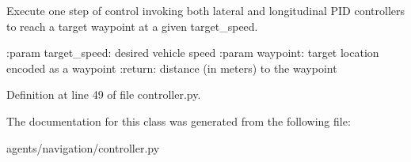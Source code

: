 \begin{DoxyVerb}Execute one step of control invoking both lateral and longitudinal PID controllers to reach a target waypoint
at a given target_speed.

:param target_speed: desired vehicle speed
:param waypoint: target location encoded as a waypoint
:return: distance (in meters) to the waypoint
\end{DoxyVerb}
 

Definition at line 49 of file controller.\+py.



The documentation for this class was generated from the following file\+:\begin{DoxyCompactItemize}
\item 
agents/navigation/controller.\+py\end{DoxyCompactItemize}
